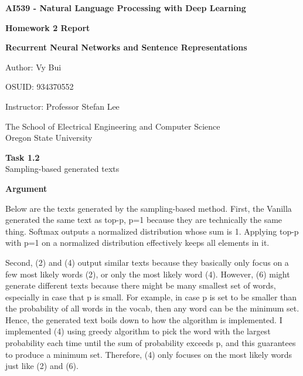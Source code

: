 \documentclass[12pt,article]{article}
\newenvironment{task}[2][Task]
    { \begin{mdframed}[backgroundcolor=gray!20] \textbf{#1 #2} \\}
    {  \end{mdframed}}
\begin{document}
\begin{titlepage}
    \begin{center}
        \vspace*{4cm}

        \textbf{\Large AI539 - Natural Language Processing with Deep Learning}

        \vspace{0.5cm}
 
        \textbf{ Homework 2 Report}

        \textbf{ Recurrent Neural Networks and Sentence Representations }
 
        \vspace{1cm}

        Author: Vy Bui

        OSUID: 934370552

        \vspace{1cm}

        Instructor: Professor Stefan Lee
        \vfill
             
        \vspace{0.8cm}
      
             
        The School of Electrical Engineering and Computer Science\\
        Oregon State University\\
             
    \end{center}
\end{titlepage}


\begin{task}{1.2} 
Sampling-based generated texts
\end{task}
\textbf{Argument}

Below are the texts generated by the sampling-based method. First, the Vanilla generated the same text as top-p, p=1 because they are technically the same thing. Softmax outputs a normalized distribution whose sum is 1. Applying top-p with p=1 on a normalized distribution effectively keeps all elements in it. 

Second, (2) and (4) output similar texts because they basically only focus on a few most likely words (2), or only the most likely word (4). However, (6) might generate different texts because there might be many smallest set of words, especially in case that p is small. For example, in case p is set to be smaller than the probability of all words in the vocab, then any word can be the minimum set. Hence, the generated text boils down to how the algorithm is implemented. I implemented (4) using greedy algorithm to pick the word with the largest probability each time until the sum of probability exceeds p, and this guarantees to produce a minimum set. Therefore, (4) only focuses on the most likely words just like (2) and (6).
\end{document}
